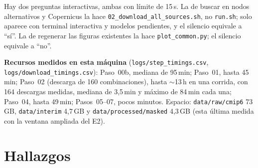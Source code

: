 Hay dos preguntas interactivas, ambas con límite de 15\,s. La de buscar en nodos alternativos y Copernicus la hace \texttt{02\_download\_all\_sources.sh}, no \texttt{run.sh}; solo aparece con terminal interactiva y modelos pendientes, y el silencio equivale a ``sí''. La de regenerar las figuras existentes la hace \texttt{plot\_common.py}; el silencio equivale a ``no''.

\textbf{Recursos medidos en esta máquina} (\texttt{logs/step\_timings.csv}, \texttt{logs/download\_timings.csv}): Paso~00b, mediana de 95\,min; Paso~01, hasta 45\,min; Paso~02 (descarga de 160 combinaciones), hasta $\sim$13\,h en una corrida, con 164 descargas medidas, mediana de 3,5\,min y máximo de 84\,min cada una; Paso~04, hasta 49\,min; Pasos~05--07, pocos minutos. Espacio: \texttt{data/raw/cmip6} 73\,GB, \texttt{data/interim} 4,7\,GB y \texttt{data/processed/masked} 4,3\,GB (esta última medida con la ventana ampliada del E2).

\section{Hallazgos}

